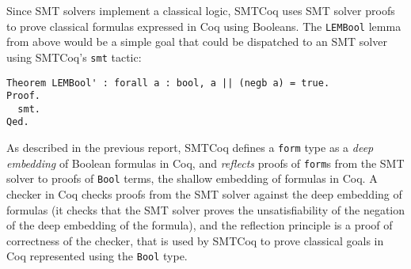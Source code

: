 \documentclass[11pt]{article}
\begin{document}
	Since SMT solvers implement 
	a classical logic, SMTCoq 
	uses SMT solver proofs to 
	prove classical formulas 
	expressed in Coq using Booleans. The 
	\texttt{LEMBool} lemma from 
	above would be a simple goal that 
	could be dispatched to an SMT 
	solver using SMTCoq's \texttt{smt}
	tactic:
	\begin{verbatim}
Theorem LEMBool' : forall a : bool, a || (negb a) = true.
Proof.
  smt.
Qed.
	\end{verbatim}
	As described in the previous report, 
	SMTCoq defines a \texttt{form} type
	as a \textit{deep embedding} of Boolean 
	formulas in Coq, and \textit{reflects} 
	proofs of \texttt{form}s from the SMT 
	solver to proofs of \texttt{Bool} 
	terms, 
	the shallow embedding of formulas 
	in Coq. A checker in Coq checks 
	proofs from the SMT solver against
	the deep embedding of formulas
	(it checks that the SMT solver proves 
	the unsatisfiability of the negation
	of the deep embedding of the formula), and 
	the reflection principle is a proof
	of correctness of the checker, that 
	is used by SMTCoq to prove classical
	goals in Coq represented using the
	\texttt{Bool} type.
	
	
\end{document}
